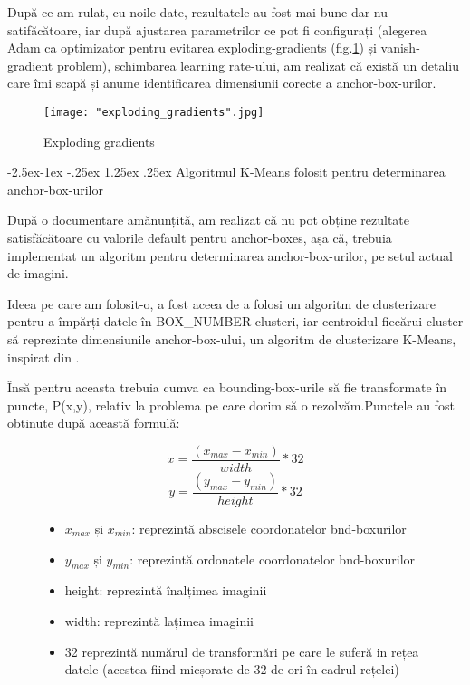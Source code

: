 \documentclass[a4paper, 12pt]{article}
\makeatletter
\renewcommand\paragraph{\@startsection{paragraph}{4}{\z@}%
	{-2.5ex\@plus -1ex \@minus -.25ex}%
	{1.25ex \@plus .25ex}%
	{\normalfont\normalsize\bfseries}}
\makeatother
\begin{document}
	După ce am rulat, cu noile date, rezultatele au fost mai bune dar nu satifăcătoare, iar după ajustarea parametrilor ce pot fi configurați (alegerea Adam ca optimizator pentru evitarea exploding-gradients (fig.\ref{fig::exploding_gradients}) și vanish-gradient problem), schimbarea learning rate-ului, am realizat că există un detaliu care îmi scapă și anume identificarea dimensiunii corecte a anchor-box-urilor.
	
	\begin{figure}[H]
		\centering
		\texttt{[image: "exploding\_gradients".jpg]}
		\caption{Exploding gradients}\label{fig::exploding_gradients}
	\end{figure} 
	
	\paragraph{Algoritmul K-Means folosit pentru determinarea anchor-box-urilor}
	
	\quad\space\space După o documentare amănunțită, am realizat că nu pot obține rezultate satisfăcătoare cu valorile default pentru anchor-boxes, așa că, trebuia implementat un algoritm pentru determinarea anchor-box-urilor, pe setul actual de imagini.
	
	Ideea pe care am folosit-o, a fost aceea de a folosi un algoritm de clusterizare pentru a împărți datele în BOX\_NUMBER clusteri, iar centroidul fiecărui cluster să reprezinte dimensiunile anchor-box-ului, un algoritm de clusterizare K-Means, inspirat din \textbf{\cite{blog_2018}}.
	
	Însă pentru aceasta trebuia cumva ca bounding-box-urile să fie transformate în puncte, P(x,y), relativ la problema pe care dorim să o rezolvăm.Punctele au fost obtinute după această formulă:
	
	\begin{figure}[H]
		\centering
		\begin{minipage}{0.3\linewidth}
			\begin{equation}
				x = \frac{(x_{max} - x_{min})}{width} * 32 
			\end{equation}
			\begin{equation}
				y = \frac{(y_{max} - y_{min})}{height} * 32
			\end{equation}
		\end{minipage}\hfill
		\begin{minipage}{0.70\linewidth}
			\begin{itemize}
				\item $x_{max}$ și $x_{min}$: reprezintă abscisele coordonatelor bnd-boxurilor
				\item $y_{max}$ și $y_{min}$: reprezintă ordonatele coordonatelor bnd-boxurilor
				\item height: reprezintă înalțimea imaginii
				\item width: reprezintă lațimea imaginii
				\item 32 reprezintă numărul de transformări pe care le suferă in rețea datele (acestea fiind micșorate de 32 de ori în cadrul rețelei)
			\end{itemize}
		\end{minipage}\hfill
	\end{figure}
	
\end{document}
